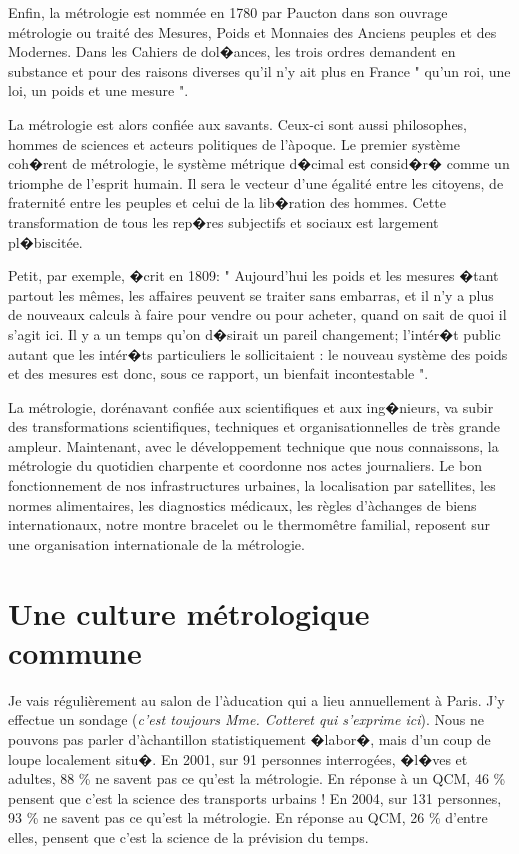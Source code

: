 Enfin, la métrologie est nommée en 1780 par Paucton dans son ouvrage métrologie ou traité des Mesures, Poids et Monnaies des Anciens peuples et des Modernes.  Dans les Cahiers de dol�ances, les trois ordres demandent en substance et pour des raisons diverses qu'il n'y ait plus en France " qu'un roi, une loi, un poids et une mesure ".

La métrologie est alors confiée aux savants. Ceux-ci sont aussi philosophes, hommes de sciences et acteurs politiques de l'àpoque.  Le premier système coh�rent de métrologie, le système métrique d�cimal est consid�r� comme un triomphe de l'esprit humain.  Il sera le vecteur d'une égalité entre les citoyens, de fraternité entre les peuples et celui de la lib�ration des hommes.  Cette transformation de tous les rep�res subjectifs et sociaux est largement pl�biscitée.

Petit, par exemple, �crit en 1809: " Aujourd'hui les poids et les mesures �tant partout les mêmes, les affaires peuvent se traiter sans embarras, et il n'y a plus de nouveaux calculs à faire pour vendre ou pour acheter, quand on sait de quoi il s'agit ici. Il y a un temps qu'on d�sirait un pareil changement; l'intér�t public autant que les intér�ts particuliers le sollicitaient : le nouveau système des poids et des mesures est donc, sous ce rapport, un bienfait incontestable ".

La métrologie, dorénavant confiée aux scientifiques et aux ing�nieurs, va subir des transformations scientifiques, techniques et organisationnelles de très grande ampleur. Maintenant, avec le développement technique que nous connaissons, la métrologie du quotidien charpente et coordonne nos actes journaliers.  Le bon fonctionnement de nos infrastructures urbaines, la localisation par satellites, les normes alimentaires, les diagnostics médicaux, les règles d'àchanges de biens internationaux, notre montre bracelet ou le thermomêtre familial, reposent sur une organisation internationale de la métrologie.

\section{Une culture métrologique commune}

Je vais régulièrement au salon de l'àducation qui a lieu annuellement à Paris. J'y effectue un sondage (\textit{c'est toujours Mme. Cotteret qui s'exprime ici}). Nous ne pouvons pas parler d'àchantillon statistiquement �labor�, mais d'un coup de loupe localement situ�.  En 2001, sur 91 personnes interrogées, �l�ves et adultes, 88 \% ne savent pas ce qu'est la métrologie.  En réponse à un QCM, 46 \% pensent que c'est la science des transports urbains ! En 2004, sur 131 personnes, 93 \% ne savent pas ce qu'est la métrologie. En réponse au QCM, 26 \% d'entre elles, pensent que c'est la science de la prévision du temps.

